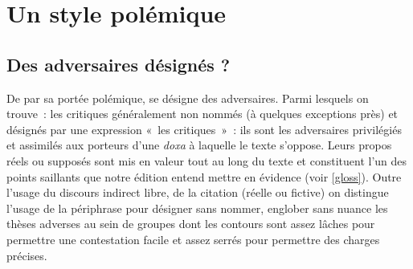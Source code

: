 \documentclass[12pt, a4paper]{article}
\begin{document}
	
%		
%		
%		
%		
	
	
	
	

\newpage

\section{Un style polémique}

\subsection{Des adversaires désignés ?}


De par sa portée polémique, \punr{} se désigne des adversaires. Parmi lesquels on trouve~: les critiques généralement non nommés (à quelques exceptions près) et désignés par une expression «~les critiques~»~: ils sont les adversaires privilégiés et assimilés aux porteurs d'une \textit{doxa} à laquelle le texte s'oppose. Leurs propos réels ou supposés sont mis en valeur tout au long du texte et constituent l'un des points saillants que notre édition entend mettre en évidence (voir \ref{gloss}). Outre l'usage du discours indirect libre, de la citation (réelle ou fictive) on distingue l'usage de la périphrase pour désigner sans nommer, englober sans nuance les thèses adverses au sein de groupes dont les contours sont assez lâches pour permettre une contestation facile et assez serrés pour permettre des charges précises.
\end{document}

